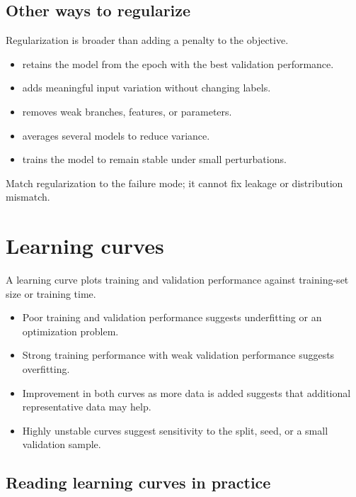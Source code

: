 \subsection{Other ways to regularize}

Regularization is broader than adding a penalty to the objective.

\begin{itemize}
  \item {} retains the model from the epoch with the best validation performance.
  \item {} adds meaningful input variation without changing labels.
    \item {} removes weak branches, features, or parameters.
  \item {} averages several models to reduce variance.
  \item {} trains the model to remain stable under small perturbations.
\end{itemize}

Match regularization to the failure mode; it cannot fix leakage or distribution mismatch.

\section{Learning curves}

A learning curve plots training and validation performance against training-set size or training time.

\begin{itemize}
  \item Poor training and validation performance suggests underfitting or an optimization problem.
  \item Strong training performance with weak validation performance suggests overfitting.
  \item Improvement in both curves as more data is added suggests that additional representative data may help.
  \item Highly unstable curves suggest sensitivity to the split, seed, or a small validation sample.
\end{itemize}

\subsection{Reading learning curves in practice}

